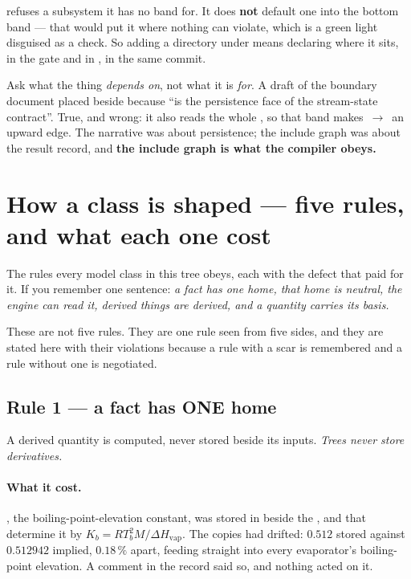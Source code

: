 \documentclass[11pt,a4paper]{article}
\begin{document}
 refuses a subsystem it has no band for.
It does \textbf{not} default one into the bottom band --- that would put it
where nothing can violate, which is a green light disguised as a check. So
adding a directory under  means declaring where it sits, in the
gate and in , in the same commit.

\begin{pitfall}
Ask what the thing \emph{depends on}, not what it is \emph{for}. A draft of
the boundary document placed  beside  because
 ``is the persistence face of the stream-state
contract''. True, and wrong: it also reads the whole ,
so that band makes \,$\to$\, an upward edge. The
narrative was about persistence; the include graph was about the result
record, and \textbf{the include graph is what the compiler obeys.}
\end{pitfall}

\section{How a class is shaped --- five rules, and what each one cost}
\label{sec:class-rules}

\begin{whatyoulllearn}
The rules every model class in this tree obeys, each with the defect that
paid for it. If you remember one sentence: \emph{a fact has one home, that
home is neutral, the engine can read it, derived things are derived, and a
quantity carries its basis.}
\end{whatyoulllearn}

These are not five rules. They are one rule seen from five sides, and they are
stated here with their violations because a rule with a scar is remembered and
a rule without one is negotiated.

\subsection{Rule 1 --- a fact has ONE home}

A derived quantity is computed, never stored beside its inputs. \emph{Trees
never store derivatives.}

\paragraph{What it cost.} , the boiling-point-elevation constant,
was stored in  beside the ,  and
 that determine it by $K_b = R T_b^2 M / \Delta H_{\mathrm{vap}}$.
The copies had drifted: $0.512$ stored against $0.512942$ implied, $0.18\,\%$
apart, feeding straight into every evaporator's boiling-point elevation. A
comment in the record said so, and nothing acted on it.
\end{document}
